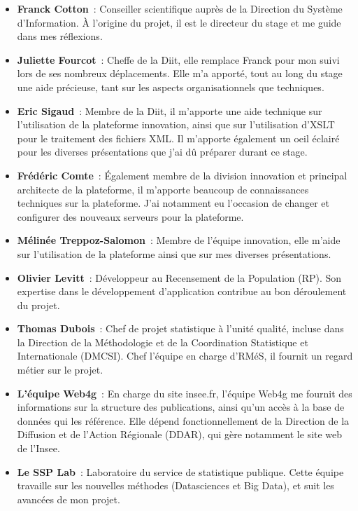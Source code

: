 \begin{itemize}
    \item \textbf{Franck Cotton}~: Conseiller scientifique auprès de la Direction du Système d'Information. À l'origine du projet, il est le directeur du stage et me guide dans mes réflexions.
    \vspace{5pt}
    \item \textbf{Juliette Fourcot}~: Cheffe de la Diit, elle remplace Franck pour mon suivi lors de ses nombreux déplacements. Elle m'a apporté, tout au long du stage une aide précieuse, tant sur les aspects organisationnels que techniques.
    \vspace{5pt}
    \item \textbf{Eric Sigaud}~: Membre de la Diit, il m'apporte une aide technique sur l'utilisation de la plateforme innovation, ainsi que sur l'utilisation d'XSLT pour le traitement des fichiers XML. Il m'apporte également un oeil éclairé pour les diverses présentations que j'ai dû préparer durant ce stage.
    \vspace{5pt}
    \item \textbf{Frédéric Comte}~: Également membre de la division innovation et principal architecte de la plateforme, il m'apporte beaucoup de connaissances techniques sur la plateforme. J'ai notamment eu l'occasion de changer et configurer des nouveaux serveurs pour la plateforme.
    \vspace{5pt}
    \item \textbf{Mélinée Treppoz-Salomon}~: Membre de l'équipe innovation, elle m'aide sur l'utilisation de la plateforme ainsi que sur mes diverses présentations.
    \vspace{5pt}
    \item \textbf{Olivier Levitt}~: Développeur au Recensement de la Population (RP). Son expertise dans le développement d'application contribue au bon déroulement du projet.
    \vspace{5pt}
    \item \textbf{Thomas Dubois}~: Chef de projet statistique à l'unité qualité, incluse dans la Direction de la Méthodologie et de la Coordination Statistique et Internationale (DMCSI). Chef l'équipe en charge d'RMéS, il fournit un regard métier sur le projet.
    \vspace{5pt}
    \item \textbf{L'équipe Web4g}~: En charge du site insee.fr, l'équipe Web4g me fournit des informations sur la structure des publications, ainsi qu'un accès à la base de données qui les référence. Elle dépend fonctionnellement de la Direction de la Diffusion et de l'Action Régionale (DDAR), qui gère notamment le site web de l'Insee.
    \vspace{5pt}
    \item \textbf{Le SSP Lab}~: Laboratoire du service de statistique publique. Cette équipe travaille sur les nouvelles méthodes (Datasciences et Big Data), et suit les avancées de mon projet.
    \newline
\end{itemize}

